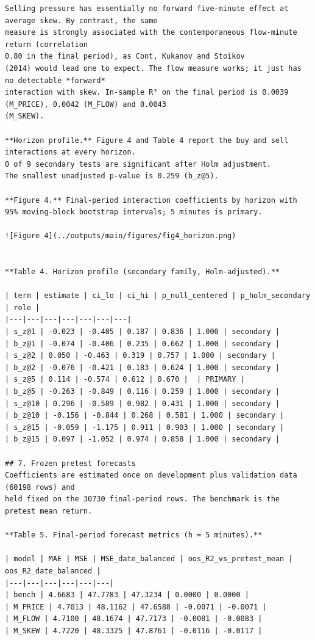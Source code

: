 \documentclass[11pt]{article}
\begin{document}
\begin{verbatim}
Selling pressure has essentially no forward five-minute effect at average skew. By contrast, the same
measure is strongly associated with the contemporaneous flow-minute return (correlation
0.80 in the final period), as Cont, Kukanov and Stoikov
(2014) would lead one to expect. The flow measure works; it just has no detectable *forward*
interaction with skew. In-sample R² on the final period is 0.0039
(M_PRICE), 0.0042 (M_FLOW) and 0.0043
(M_SKEW).

**Horizon profile.** Figure 4 and Table 4 report the buy and sell interactions at every horizon.
0 of 9 secondary tests are significant after Holm adjustment.
The smallest unadjusted p-value is 0.259 (b_z@5).

**Figure 4.** Final-period interaction coefficients by horizon with 95% moving-block bootstrap intervals; 5 minutes is primary.

![Figure 4](../outputs/main/figures/fig4_horizon.png)


**Table 4. Horizon profile (secondary family, Holm-adjusted).**

| term | estimate | ci_lo | ci_hi | p_null_centered | p_holm_secondary | role |
|---|---|---|---|---|---|---|
| s_z@1 | -0.023 | -0.405 | 0.187 | 0.836 | 1.000 | secondary |
| b_z@1 | -0.074 | -0.406 | 0.235 | 0.662 | 1.000 | secondary |
| s_z@2 | 0.050 | -0.463 | 0.319 | 0.757 | 1.000 | secondary |
| b_z@2 | -0.076 | -0.421 | 0.183 | 0.624 | 1.000 | secondary |
| s_z@5 | 0.114 | -0.574 | 0.612 | 0.670 |  | PRIMARY |
| b_z@5 | -0.263 | -0.849 | 0.116 | 0.259 | 1.000 | secondary |
| s_z@10 | 0.296 | -0.589 | 0.982 | 0.431 | 1.000 | secondary |
| b_z@10 | -0.156 | -0.844 | 0.268 | 0.581 | 1.000 | secondary |
| s_z@15 | -0.059 | -1.175 | 0.911 | 0.903 | 1.000 | secondary |
| b_z@15 | 0.097 | -1.052 | 0.974 | 0.858 | 1.000 | secondary |

## 7. Frozen pretest forecasts
Coefficients are estimated once on development plus validation data (60198 rows) and
held fixed on the 30730 final-period rows. The benchmark is the pretest mean return.

**Table 5. Final-period forecast metrics (h = 5 minutes).**

| model | MAE | MSE | MSE_date_balanced | oos_R2_vs_pretest_mean | oos_R2_date_balanced |
|---|---|---|---|---|---|
| bench | 4.6683 | 47.7783 | 47.3234 | 0.0000 | 0.0000 |
| M_PRICE | 4.7013 | 48.1162 | 47.6588 | -0.0071 | -0.0071 |
| M_FLOW | 4.7100 | 48.1674 | 47.7173 | -0.0081 | -0.0083 |
| M_SKEW | 4.7220 | 48.3325 | 47.8761 | -0.0116 | -0.0117 |


\end{verbatim}
\end{document}
